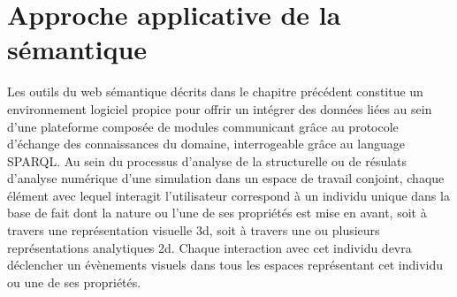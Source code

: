 \section{Approche applicative de la sémantique}




Les outils du web sémantique décrits dans le chapitre précédent constitue un environnement logiciel propice pour offrir un intégrer des données liées au sein d'une plateforme composée de modules communicant grâce au protocole d'échange des connaissances du domaine, interrogeable grâce au language SPARQL. %
Au sein du processus d'analyse de la structurelle ou de résulats d'analyse numérique d'une simulation dans un espace de travail conjoint, chaque élément avec lequel interagit l'utilisateur correspond à un individu unique dans la base de fait dont la nature ou l'une de ses propriétés est mise en avant, soit à travers une représentation visuelle 3d, soit à travers une ou plusieurs représentations analytiques 2d. Chaque interaction avec cet individu devra déclencher un évènements visuels dans tous les espaces représentant cet individu ou une de ses propriétés.

